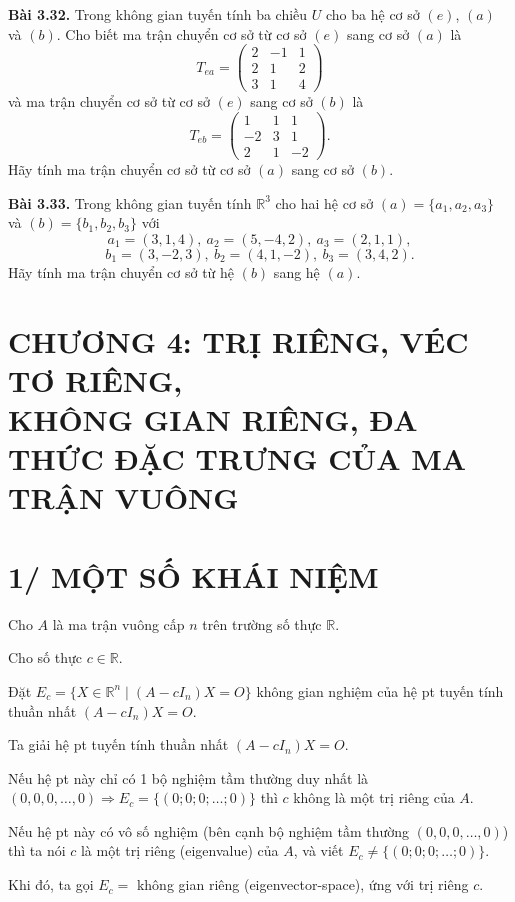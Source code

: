 \documentclass[12pt,a4paper]{article}
\newcommand{\R}{\mathbb{R}}
\begin{document}
\medskip
\noindent\textbf{Bài 3.32.} Trong không gian tuyến tính ba chiều $U$ cho ba hệ cơ sở $(e)$, $(a)$ và $(b)$. Cho biết ma trận chuyển cơ sở từ cơ sở $(e)$ sang cơ sở $(a)$ là
\[
T_{ea}=\begin{pmatrix}2 & -1 & 1\\ 2 & 1 & 2\\ 3 & 1 & 4\end{pmatrix}
\]
và ma trận chuyển cơ sở từ cơ sở $(e)$ sang cơ sở $(b)$ là
\[
T_{eb}=\begin{pmatrix}1 & 1 & 1\\ -2 & 3 & 1\\ 2 & 1 & -2\end{pmatrix}.
\]
Hãy tính ma trận chuyển cơ sở từ cơ sở $(a)$ sang cơ sở $(b)$.

\medskip
\noindent\textbf{Bài 3.33.} Trong không gian tuyến tính $\R^3$ cho hai hệ cơ sở $(a)=\{a_1,a_2,a_3\}$ và $(b)=\{b_1,b_2,b_3\}$ với
\[
a_1=(3,1,4),\ a_2=(5,-4,2),\ a_3=(2,1,1),
\]
\[
b_1=(3,-2,3),\ b_2=(4,1,-2),\ b_3=(3,4,2).
\]
Hãy tính ma trận chuyển cơ sở từ hệ $(b)$ sang hệ $(a)$.

\newpage
\section*{CHƯƠNG 4: TRỊ RIÊNG, VÉC TƠ RIÊNG,\\ KHÔNG GIAN RIÊNG, ĐA THỨC ĐẶC TRƯNG CỦA MA TRẬN VUÔNG}

\section*{1/ MỘT SỐ KHÁI NIỆM}

Cho $A$ là ma trận vuông cấp $n$ trên trường số thực $\R$.

Cho số thực $c\in\R$.

Đặt $E_c=\{X\in\R^n \mid (A-cI_n)X=O\}$ không gian nghiệm của hệ pt tuyến tính thuần nhất $(A-cI_n)X=O$.

Ta giải hệ pt tuyến tính thuần nhất $(A-cI_n)X=O$.

Nếu hệ pt này chỉ có 1 bộ nghiệm tầm thường duy nhất là $(0,0,0,\ldots,0)\Rightarrow E_c=\{(0;0;0;\ldots;0)\}$ thì $c$ không là một trị riêng của $A$.

Nếu hệ pt này có vô số nghiệm (bên cạnh bộ nghiệm tầm thường $(0,0,0,\ldots,0)$) thì ta nói $c$ là một trị riêng (eigenvalue) của $A$, và viết $E_c\neq\{(0;0;0;\ldots;0)\}$.

Khi đó, ta gọi $E_c=$ không gian riêng (eigenvector-space), ứng với trị riêng $c$.
\end{document}

